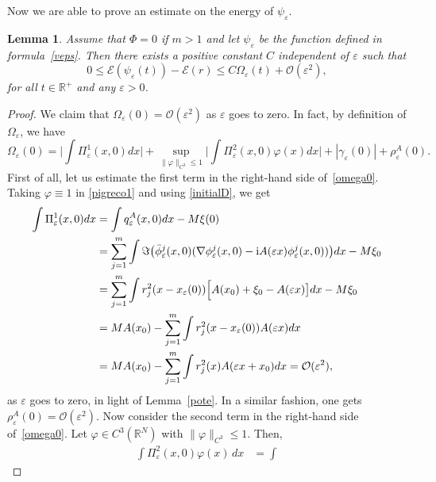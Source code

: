 \documentclass[11pt]{amsart}
\numberwithin{equation}{section}
\newtheorem{lemma}[theorem]{Lemma}
\theoremstyle{definition}
\begin{document}
Now we are able to prove an estimate on the energy of $\psi_{\varepsilon}$.

\begin{lemma}\label{lemmaOmegaepsilon}
Assume that $\Phi=0$ if $m>1$ and
let $\psi_{\varepsilon}$ be the function defined in formula~\eqref{veps}.
Then there exists a positive constant $C$ independent of ${\varepsilon}$ such that
\begin{equation*}
0\leq \mathcal E(\psi_{\varepsilon}(t)) -\mathcal E(r) \leq
C\Omega_{\varepsilon}(t)+{\mathcal O}({\varepsilon}^2),
\end{equation*}
for all $t\in{{\mathbb R}}^+$ and any ${\varepsilon}>0$.
\end{lemma}
\begin{proof}
We claim that $\Omega_{\varepsilon}(0)=\mathcal O ({\varepsilon}^2)$ as ${\varepsilon}$ goes
to zero. In fact, by definition of $\Omega_{\varepsilon}$, we have
\begin{equation}\label{omega0}
\Omega_{\varepsilon}(0)=\Big|\int
\Pi^1_{\varepsilon}(x,0)dx\Big|+\sup_{\|\varphi\|_{C^3}\leq 1} \Big|\int
\Pi^2_{\varepsilon}(x,0)\varphi(x)dx\Big|+|\gamma_{\varepsilon}(0)|+\rho_{\varepsilon}^A(0).
\end{equation}
First of all, let us estimate the first term in the right-hand side
of~\eqref{omega0}. Taking $\varphi \equiv 1$ in \eqref{pigreco1} and
using \eqref{initialD}, we get
$$
\begin{aligned}
\int \Pi^1_{\varepsilon}(x,0)dx& =\int q^A_{\varepsilon}(x,0)dx-M\xi(0)\\
& =\sum_{j=1}^{m}\int {{\Im}}\big(\bar\phi_{\varepsilon}^j(x,0)(
\nabla\phi_{\varepsilon}^j(x,0)-{{\rm i}}
A({\varepsilon} x)\phi_{\varepsilon}^j(x,0))\big)dx-M\xi_0\\
& =\sum_{j=1}^{m}\int
r_j^2(x-x_{\varepsilon}(0))\Big[A(x_0)+\xi_0-A({\varepsilon} x)\big]dx-M\xi_0\\
& = MA(x_0)-\sum_{j=1}^{m}\int
r_j^2(x-x_{\varepsilon}(0))A({\varepsilon} x)dx\\
& = MA(x_0)-\sum_{j=1}^{m}\int r_j^2(x)A({\varepsilon} x+x_0)dx= \mathcal O
({\varepsilon}^2),
\end{aligned}
$$
as ${\varepsilon}$ goes to zero, in light of Lemma~\ref{pote}. In a similar fashion, one gets
$\rho^A_{\varepsilon}(0)= {\mathcal O}({\varepsilon}^2)$. Now consider the
second term in the right-hand side of~\eqref{omega0}. Let
$\varphi\in C^3({{\mathbb R}}^N)$ with $\|\varphi\|_{C^3}\leq 1$. Then,
$$\begin{aligned}
\int \Pi^2_{\varepsilon}(x,0)\varphi(x) \,dx& =\int

\end{aligned}$$
\end{proof}
\end{document}
